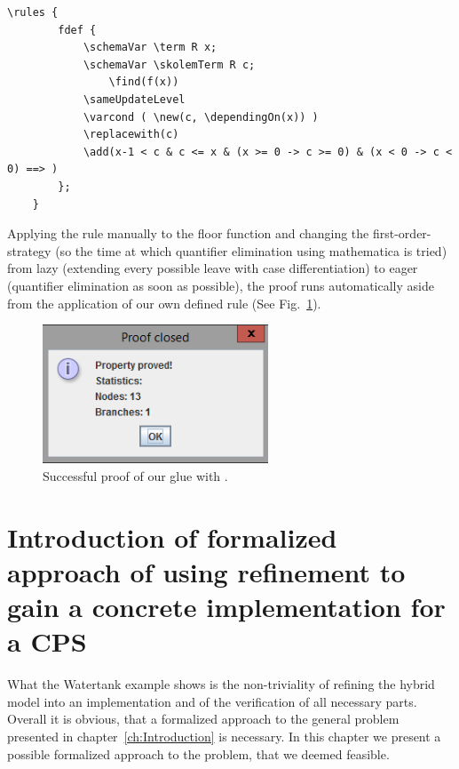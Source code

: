 \begin{lstlisting}[label=lst:ruleF]
	\rules {
 	 	fdef {
			\schemaVar \term R x;
			\schemaVar \skolemTerm R c;
    			\find(f(x))
			\sameUpdateLevel
			\varcond ( \new(c, \dependingOn(x)) )
			\replacewith(c)
			\add(x-1 < c & c <= x & (x >= 0 -> c >= 0) & (x < 0 -> c < 0) ==> )
		};
	}	
\end{lstlisting}

Applying the rule manually to the floor function and changing the first-order-strategy (so the time at which quantifier elimination using mathematica is tried) from lazy (extending every possible leave with case differentiation) to eager (quantifier elimination as soon as possible), the proof runs automatically aside from the application of our own defined rule (See Fig.~\ref{fig:GlueProof}).

\begin{figure}
	\centering
	\includegraphics[width=0.6\textwidth]{images/glue_proof}
	\caption{Successful proof of our glue with \keym.}
	\label{fig:GlueProof}
\end{figure}

\chapter{Introduction of formalized approach of using refinement to gain a concrete implementation for a CPS}
\label{ch:Process}

What the Watertank example shows is the non-triviality of refining the hybrid model into an implementation and of the verification of all necessary parts. Overall it is obvious, that a formalized approach to the general problem presented in chapter~\ref{ch:Introduction} is necessary. In this chapter we present a possible formalized approach to the problem, that we deemed feasible.
\\


